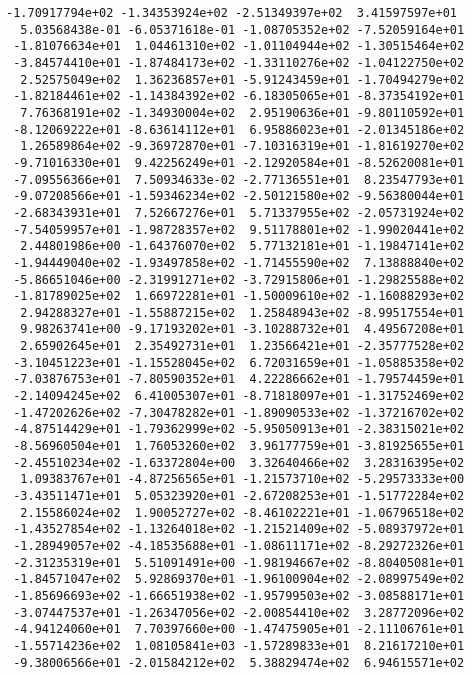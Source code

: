 \documentclass[11pt]{article}
\begin{document}
\begin{Verbatim}[commandchars=\\\{\}]
 -1.70917794e+02 -1.34353924e+02 -2.51349397e+02  3.41597597e+01
  5.03568438e-01 -6.05371618e-01 -1.08705352e+02 -7.52059164e+01
 -1.81076634e+01  1.04461310e+02 -1.01104944e+02 -1.30515464e+02
 -3.84574410e+01 -1.87484173e+02 -1.33110276e+02 -1.04122750e+02
  2.52575049e+02  1.36236857e+01 -5.91243459e+01 -1.70494279e+02
 -1.82184461e+02 -1.14384392e+02 -6.18305065e+01 -8.37354192e+01
  7.76368191e+02 -1.34930004e+02  2.95190636e+01 -9.80110592e+01
 -8.12069222e+01 -8.63614112e+01  6.95886023e+01 -2.01345186e+02
  1.26589864e+02 -9.36972870e+01 -7.10316319e+01 -1.81619270e+02
 -9.71016330e+01  9.42256249e+01 -2.12920584e+01 -8.52620081e+01
 -7.09556366e+01  7.50934633e-02 -2.77136551e+01  8.23547793e+01
 -9.07208566e+01 -1.59346234e+02 -2.50121580e+02 -9.56380044e+01
 -2.68343931e+01  7.52667276e+01  5.71337955e+02 -2.05731924e+02
 -7.54059957e+01 -1.98728357e+02  9.51178801e+02 -1.99020441e+02
  2.44801986e+00 -1.64376070e+02  5.77132181e+01 -1.19847141e+02
 -1.94449040e+02 -1.93497858e+02 -1.71455590e+02  7.13888840e+02
 -5.86651046e+00 -2.31991271e+02 -3.72915806e+01 -1.29825588e+02
 -1.81789025e+02  1.66972281e+01 -1.50009610e+02 -1.16088293e+02
  2.94288327e+01 -1.55887215e+02  1.25848943e+02 -8.99517554e+01
  9.98263741e+00 -9.17193202e+01 -3.10288732e+01  4.49567208e+01
  2.65902645e+01  2.35492731e+01  1.23566421e+01 -2.35777528e+02
 -3.10451223e+01 -1.15528045e+02  6.72031659e+01 -1.05885358e+02
 -7.03876753e+01 -7.80590352e+01  4.22286662e+01 -1.79574459e+01
 -2.14094245e+02  6.41005307e+01 -8.71818097e+01 -1.31752469e+02
 -1.47202626e+02 -7.30478282e+01 -1.89090533e+02 -1.37216702e+02
 -4.87514429e+01 -1.79362999e+02 -5.95050913e+01 -2.38315021e+02
 -8.56960504e+01  1.76053260e+02  3.96177759e+01 -3.81925655e+01
 -2.45510234e+02 -1.63372804e+00  3.32640466e+02  3.28316395e+02
  1.09383767e+01 -4.87256565e+01 -1.21573710e+02 -5.29573333e+00
 -3.43511471e+01  5.05323920e+01 -2.67208253e+01 -1.51772284e+02
  2.15586024e+02  1.90052727e+02 -8.46102221e+01 -1.06796518e+02
 -1.43527854e+02 -1.13264018e+02 -1.21521409e+02 -5.08937972e+01
 -1.28949057e+02 -4.18535688e+01 -1.08611171e+02 -8.29272326e+01
 -2.31235319e+01  5.51091491e+00 -1.98194667e+02 -8.80405081e+01
 -1.84571047e+02  5.92869370e+01 -1.96100904e+02 -2.08997549e+02
 -1.85696693e+02 -1.66651938e+02 -1.95799503e+02 -3.08588171e+01
 -3.07447537e+01 -1.26347056e+02 -2.00854410e+02  3.28772096e+02
 -4.94124060e+01  7.70397660e+00 -1.47475905e+01 -2.11106761e+01
 -1.55714236e+02  1.08105841e+03 -1.57289833e+01  8.21617210e+01
 -9.38006566e+01 -2.01584212e+02  5.38829474e+02  6.94615571e+02

\end{Verbatim}
\end{document}
